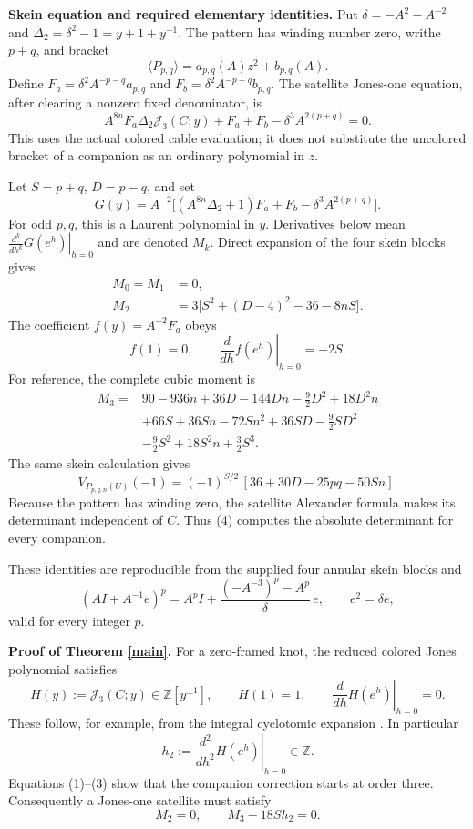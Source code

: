 \documentclass[11pt]{article}
\newcommand{\Z}{\mathbb Z}
\newcommand{\J}{\mathcal J}
\begin{document}
\newpage
\textbf{Skein equation and required elementary identities.}
Put $\delta=-A^2-A^{-2}$ and $\Delta_2=\delta^2-1=y+1+y^{-1}$. The pattern has winding number zero, writhe $p+q$, and bracket
\[
 \langle P_{p,q}\rangle=a_{p,q}(A)z^2+b_{p,q}(A).
\]
Define $F_a=\delta^2 A^{-p-q}a_{p,q}$ and
$F_b=\delta^2 A^{-p-q}b_{p,q}$. The satellite Jones-one equation, after clearing a nonzero fixed denominator, is
\[
 A^{8n}F_a\Delta_2\J_3(C;y)+F_a+F_b
       -\delta^3 A^{2(p+q)}=0.                         \tag{1}
\]
This uses the actual colored cable evaluation; it does not substitute the uncolored bracket of a companion as an ordinary polynomial in $z$.

Let $S=p+q$, $D=p-q$, and set
\[
 G(y)=A^{-2}\big[(A^{8n}\Delta_2+1)F_a+F_b
                         -\delta^3A^{2(p+q)}\big].
\]
For odd $p,q$, this is a Laurent polynomial in $y$. Derivatives below mean
$\left.\frac{d^k}{dh^k}G(e^h)\right|_{h=0}$ and are denoted $M_k$.
Direct expansion of the four skein blocks gives
\begin{align}
 M_0=M_1&=0, \nonumber\\
 M_2&=3\big[S^2+(D-4)^2-36-8nS\big].                 \tag{2}
\end{align}
The coefficient $f(y)=A^{-2}F_a$ obeys
\[
 f(1)=0,\qquad
 \left.\frac{d}{dh}f(e^h)\right|_{h=0}=-2S.          \tag{3}
\]
For reference, the complete cubic moment is
\begin{align*}
 M_3={}&90-936n+36D-144Dn-\tfrac92D^2+18D^2n\\
      &+66S+36Sn-72Sn^2+36SD-\tfrac92SD^2\\
      &-\tfrac92S^2+18S^2n+\tfrac32S^3.
\end{align*}
The same skein calculation gives
\[
 V_{P_{p,q,n}(U)}(-1)=
 (-1)^{S/2}\,[36+30D-25pq-50Sn].                    \tag{4}
\]
Because the pattern has winding zero, the satellite Alexander formula makes its determinant independent of $C$. Thus (4) computes the absolute determinant for every companion.

These identities are reproducible from the supplied four annular skein blocks and
\[
 (AI+A^{-1}e)^p=A^p I+
       \frac{(-A^{-3})^p-A^p}{\delta}\,e,\qquad e^2=\delta e,
\]
valid for every integer $p$.

\newpage
\textbf{Proof of Theorem \ref{main}.}
For a zero-framed knot, the reduced colored Jones polynomial satisfies
\[
 H(y):=\J_3(C;y)\in\Z[y^{\pm1}],\qquad H(1)=1,\qquad
 \left.\frac{d}{dh}H(e^h)\right|_{h=0}=0.
\]
These follow, for example, from the integral cyclotomic expansion \cite{Habiro}. In particular
\[
 h_2:=\left.\frac{d^2}{dh^2}H(e^h)\right|_{h=0}\in\Z.
\]
Equations (1)--(3) show that the companion correction starts at order three. Consequently a Jones-one satellite must satisfy
\[
 M_2=0,\qquad M_3-18S h_2=0.                        \tag{5}
\]
\end{document}

